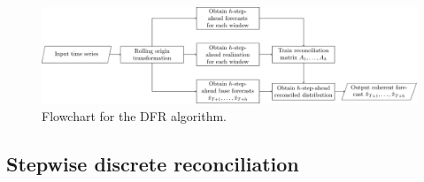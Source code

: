 \documentclass[a4paper,review,11pt,authoryear]{elsarticle}
\theoremstyle{definition}
\begin{document}
    \begin{figure}
    \centering
    \includegraphics[width=\textwidth]{figures/DFR.pdf}
    \caption{\label{fig:dfr}Flowchart for the DFR algorithm.}
    \end{figure}


    \subsection{Stepwise discrete reconciliation}
    \label{sec:algorithm2}
\end{document}

